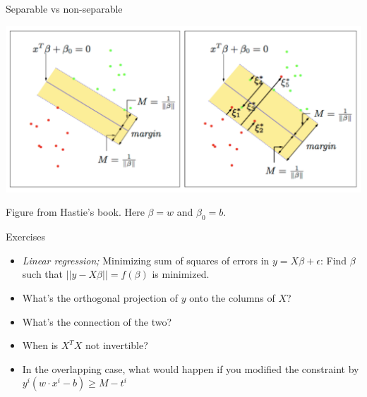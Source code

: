 \documentclass{beamer}
\begin{document}

\begin{frame}{Separable vs non-separable}

\includegraphics[scale=0.42]{figures/margin.png}

\caption{   Figure from Hastie's book. Here $\beta = w$ and $\beta_0 = b$.}

\end{frame}


\begin{frame}{Exercises}
\begin{itemize}
    \item \textit{Linear regression;} Minimizing sum of squares of errors in $y=X\beta + \epsilon$:  Find $\beta$ such that $||y-X\beta||=f(\beta)$ is minimized. 
    \item What's the orthogonal projection of $y$ onto the columns of $X$?
    \item What's the connection of the two?
    \item When is $X^TX$ not invertible?
    \item In the overlapping case, what would happen if you modified the constraint by $y^i(w\cdot x^i - b) \geq M - t^i$
\end{itemize}
\end{frame}

\end{document}

